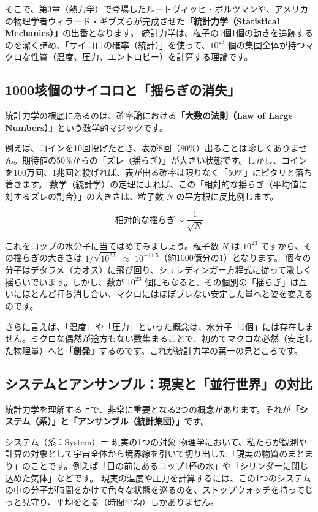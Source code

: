 そこで、第3章（熱力学）で登場したルートヴィッヒ・ボルツマンや、アメリカの物理学者ウィラード・ギブズらが完成させた\textbf{「統計力学（Statistical Mechanics）」}の出番となります。 統計力学は、粒子の1個1個の動きを追跡するのを潔く諦め、「サイコロの確率（統計）」を使って、\ensuremath{10^{23}} 個の集団全体が持つマクロな性質（温度、圧力、エントロピー）を計算する理論です。

\subsection{1000垓個のサイコロと「揺らぎの消失」}

統計力学の根底にあるのは、確率論における\textbf{「大数の法則（Law of Large Numbers）」}という数学的マジックです。

例えば、コインを10回投げたとき、表が8回（80\%）出ることは珍しくありません。期待値の50\%からの「ズレ（揺らぎ）」が大きい状態です。しかし、コインを100万回、1兆回と投げれば、表が出る確率は限りなく「50\%」にピタリと落ち着きます。 数学（統計学）の定理によれば、この「相対的な揺らぎ（平均値に対するズレの割合）」の大きさは、粒子数 \(N\) の平方根に反比例します。

\[
\text{相対的な揺らぎ} \sim \frac{1}{\sqrt{N}}
\]

これをコップの水分子に当てはめてみましょう。粒子数 \(N\) は \ensuremath{10^{23}} ですから、その揺らぎの大きさは \ensuremath{1/\sqrt{10^{23}}} \ensuremath{\approx} \ensuremath{10^{-11.5}}（約1000億分の1）となります。 個々の分子はデタラメ（カオス）に飛び回り、シュレディンガー方程式に従って激しく揺らいでいます。しかし、数が \ensuremath{10^{23}} 個にもなると、その個別の「揺らぎ」は互いにほとんど打ち消し合い、マクロにはほぼブレない安定した量へと姿を変えるのです。

さらに言えば、「温度」や「圧力」といった概念は、水分子「1個」には存在しません。ミクロな偶然が途方もない数集まることで、初めてマクロな必然（安定した物理量）へと\textbf{「創発」}するのです。これが統計力学の第一の見どころです。

\subsection{システムとアンサンブル：現実と「並行世界」の対比}

統計力学を理解する上で、非常に重要となる2つの概念があります。それが\textbf{「システム（系）」と「アンサンブル（統計集団）」}です。

システム（系：System）＝ 現実の1つの対象 物理学において、私たちが観測や計算の対象として宇宙全体から境界線を引いて切り出した「現実の物質のまとまり」のことです。例えば「目の前にあるコップ1杯の水」や「シリンダーに閉じ込めた気体」などです。 現実の温度や圧力を計算するには、この1つのシステムの中の分子が時間をかけて色々な状態を巡るのを、ストップウォッチを持ってじっと見守り、平均をとる（時間平均）しかありません。

